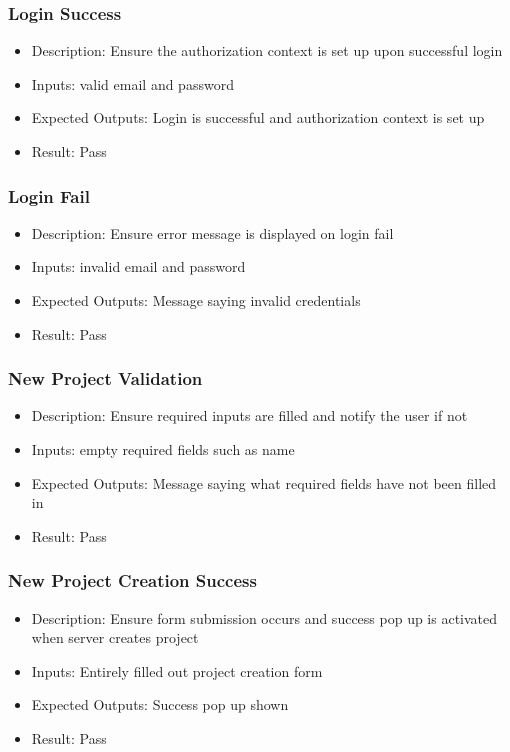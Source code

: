\documentclass[12pt, titlepage]{article}
\begin{document}
\subsubsection{Login Success}
\begin{itemize}
    \item Description: Ensure the authorization context is set up upon successful login
    \item Inputs: valid email and password
    \item Expected Outputs: Login is successful and authorization context is set up
    \item Result: Pass
\end{itemize}
\subsubsection{Login Fail}
\begin{itemize}
    \item Description: Ensure error message is displayed on login fail
    \item Inputs: invalid email and password
    \item Expected Outputs: Message saying invalid credentials
    \item Result: Pass
\end{itemize}
\subsubsection{New Project Validation}
\begin{itemize}
    \item Description: Ensure required inputs are filled and notify the user if not
    \item Inputs: empty required fields such as name
    \item Expected Outputs: Message saying what required fields have not been filled in
    \item Result: Pass
\end{itemize}
\subsubsection{New Project Creation Success}
\begin{itemize}
    \item Description: Ensure form submission occurs and success pop up is activated when server creates project
    \item Inputs: Entirely filled out project creation form
    \item Expected Outputs: Success pop up shown
    \item Result: Pass
\end{itemize}
\end{document}
